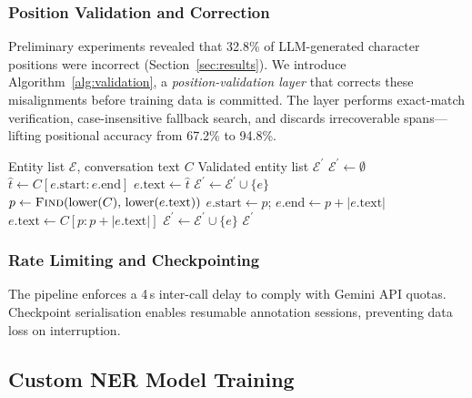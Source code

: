 \documentclass[conference]{IEEEtran}
\begin{document}
\subsubsection{Position Validation and Correction}

Preliminary experiments revealed that 32.8\% of LLM-generated character
positions were incorrect (Section~\ref{sec:results}). We introduce
Algorithm~\ref{alg:validation}, a \emph{position-validation layer} that
corrects these misalignments before training data is committed. The layer
performs exact-match verification, case-insensitive fallback search, and
discards irrecoverable spans—lifting positional accuracy from 67.2\% to
94.8\%.

\begin{algorithm}[t]
\caption{Entity Position Validation and Correction}
\label{alg:validation}
\begin{algorithmic}[1]
\REQUIRE Entity list $\mathcal{E}$, conversation text $C$
\ENSURE Validated entity list $\mathcal{E}^{\prime}$
\STATE $\mathcal{E}^{\prime} \leftarrow \emptyset$
  \STATE $\hat{t} \leftarrow C[e.\text{start} : e.\text{end}]$
    \STATE $e.\text{text} \leftarrow \hat{t}$ \hfill{}
    \STATE $\mathcal{E}^{\prime} \leftarrow \mathcal{E}^{\prime} \cup \{e\}$
  \ELSE
    \STATE $p \leftarrow \textsc{Find}(\text{lower}(C),\, \text{lower}(e.\text{text}))$
      \STATE $e.\text{start} \leftarrow p$;\; $e.\text{end} \leftarrow p + |e.\text{text}|$
      \STATE $e.\text{text} \leftarrow C[p : p + |e.\text{text}|]$
      \STATE $\mathcal{E}^{\prime} \leftarrow \mathcal{E}^{\prime} \cup \{e\}$
    \ENDIF \hfill{}
  \ENDIF
\ENDFOR
\RETURN $\mathcal{E}^{\prime}$
\end{algorithmic}
\end{algorithm}

\subsubsection{Rate Limiting and Checkpointing}

The pipeline enforces a 4\,s inter-call delay to comply with Gemini API
quotas. Checkpoint serialisation enables resumable annotation sessions,
preventing data loss on interruption.

\subsection{Custom NER Model Training}
\label{subsec:ner}
\end{document}
